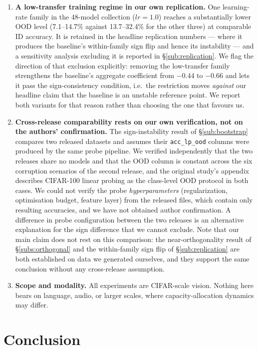 \documentclass[10pt]{article} %
\newcommand{\srcref}[1]{\S\ref{#1}}
\begin{document}
\begin{enumerate}
\item \label{lim:nonconverged} \textbf{A low-transfer training regime in our own replication.} One learning-rate family in the 48-model collection ($lr=1.0$) reaches a substantially lower OOD level (7.1--14.7\% against 13.7--32.4\% for the other three) at comparable ID accuracy. It is retained in the headline replication numbers --- where it produces the baseline's within-family sign flip and hence its instability --- and a sensitivity analysis excluding it is reported in \srcref{sub:replication}. We flag the direction of that exclusion explicitly: removing the low-transfer family strengthens the baseline's aggregate coefficient from $-0.44$ to $-0.66$ and lets it pass the sign-consistency condition, i.e.\ the restriction moves \emph{against} our headline claim that the baseline is an unstable reference point. We report both variants for that reason rather than choosing the one that favours us.
\item \label{lim:crossrelease} \textbf{Cross-release comparability rests on our own verification, not on the authors' confirmation.} The sign-instability result of \srcref{sub:bootstrap} compares two released datasets and assumes their \texttt{acc\_lp\_ood} columns were produced by the same probe pipeline. We verified independently that the two releases share no models and that the OOD column is constant across the six corruption scenarios of the second release, and the original study's appendix describes CIFAR-100 linear probing as the class-level OOD protocol in both cases. We could not verify the probe \emph{hyperparameters} (regularization, optimisation budget, feature layer) from the released files, which contain only resulting accuracies, and we have not obtained author confirmation. A difference in probe configuration between the two releases is an alternative explanation for the sign difference that we cannot exclude. Note that our main claim does not rest on this comparison: the near-orthogonality result of \srcref{subs:orthogonal} and the within-family sign flip of \srcref{sub:replication} are both established on data we generated ourselves, and they support the same conclusion without any cross-release assumption.
\item \textbf{Scope and modality.} All experiments are CIFAR-scale vision. Nothing here bears on language, audio, or larger scales, where capacity-allocation dynamics may differ.
\end{enumerate}

\section{Conclusion}
\label{sec:conclusion}
\end{document}
